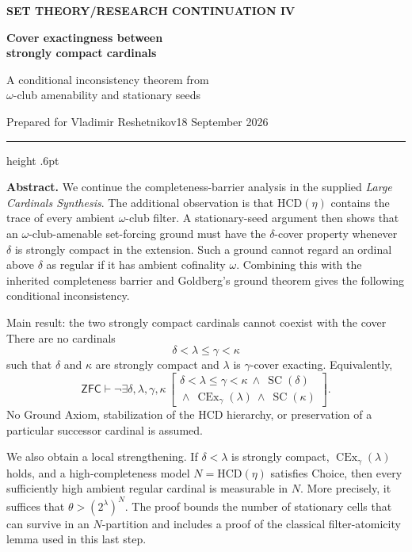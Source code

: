 \documentclass[11pt,letterpaper]{article}
\theoremstyle{definition}
\numberwithin{equation}{section}
\newcommand{\ZFC}{\mathsf{ZFC}}
\newcommand{\HCD}{\mathrm{HCD}}
\newcommand{\SC}{\operatorname{SC}}
\newcommand{\CEx}{\operatorname{CEx}}
\begin{document}
\thispagestyle{empty}
{\sffamily\bfseries\small\color{Olive}SET THEORY\quad /\quad RESEARCH CONTINUATION IV}

\vspace{13pt}
{\fontsize{28}{31}\selectfont\bfseries\color{Forest}Cover exactingness between\\ strongly compact cardinals\par}
\vspace{10pt}
{\fontsize{14}{18}\selectfont A conditional inconsistency theorem from\\ $\omega$-club amenability and stationary seeds\par}
\vspace{14pt}
{\color{Muted}Prepared for Vladimir Reshetnikov\hfill 18 September 2026\par}
\vspace{3pt}
{\color{Sage}\hrule height .6pt}
\vspace{12pt}

\textbf{Abstract.}
We continue the completeness-barrier analysis in the supplied
\emph{Large Cardinals Synthesis}. The additional observation is that
$\HCD(\eta)$ contains the trace of every ambient $\omega$-club filter.
A stationary-seed argument then shows that an $\omega$-club-amenable
set-forcing ground must have the $\delta$-cover property whenever
$\delta$ is strongly compact in the extension. Such a ground cannot
regard an ordinal above $\delta$ as regular if it has ambient cofinality
$\omega$. Combining this with the inherited completeness barrier and
Goldberg's ground theorem gives the following conditional inconsistency.

\begin{assessment}{Main result: the two strongly compact cardinals cannot coexist with the cover}
There are no cardinals
\[
\delta<\lambda\le\gamma<\kappa
\]
such that $\delta$ and $\kappa$ are strongly compact and $\lambda$ is
$\gamma$-cover exacting. Equivalently,
\[
\ZFC\vdash
\neg\exists\delta,\lambda,\gamma,\kappa\,
\begin{bmatrix}
\delta<\lambda\le\gamma<\kappa\ \wedge\ \SC(\delta)\\[-2pt]
{}\wedge\ \CEx_\gamma(\lambda)\ \wedge\ \SC(\kappa)
\end{bmatrix}.
\]
No Ground Axiom, stabilization of the $\HCD$ hierarchy, or preservation
of a particular successor cardinal is assumed.
\end{assessment}

We also obtain a local strengthening. If $\delta<\lambda$ is strongly
compact, $\CEx_\gamma(\lambda)$ holds, and a high-completeness model
$N=\HCD(\eta)$ satisfies Choice, then every sufficiently high ambient
regular cardinal is measurable in $N$. More precisely, it suffices that
$\theta>(2^\lambda)^N$. The proof bounds the number of stationary cells
that can survive in an $N$-partition and includes a proof of the
classical filter-atomicity lemma used in this last step.
\end{document}

